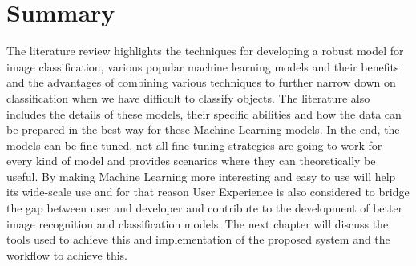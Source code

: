 \section{Summary}

The literature review highlights the techniques for developing a robust model for image classification, various popular machine learning models and their benefits and the advantages of combining various techniques to further narrow down on classification when we have difficult to classify objects. The literature also includes the details of these models, their specific abilities and how the data can be prepared in the best way for these Machine Learning models. In the end, the models can be fine-tuned, not all fine tuning strategies are going to work for every kind of model and provides scenarios where they can theoretically be useful. By making Machine Learning more interesting and easy to use will help its wide-scale use and for that reason User Experience is also considered to bridge the gap between user and developer and contribute to the development of better image recognition and classification models. The next chapter will discuss the tools used to achieve this and implementation of the proposed system and the workflow to achieve this.
